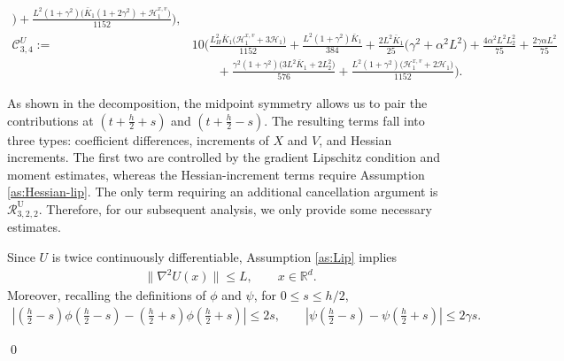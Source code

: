 \documentclass[12pt]{article}
\newenvironment{redtext}
  {\color{black}\ignorespaces}
  {\ignorespacesafterend}
\numberwithin{equation}{section}
\renewenvironment{proof}%
  {\begin{trivlist}%
   \item[]\ignorespaces}%
  {\qed\end{trivlist}}
\begin{document}
\begin{redtext}
\begin{proof}
\begin{align}
\big)
+
\tfrac{
L^2(1+\gamma^2)
\big(
\bar K_1(1+2\gamma^2)
+
\mathscr H_1^{x,v}
\big)
}{1152}
\Bigg),
\nonumber\\
%
\mathcal C^{U}_{3,4}
:=&
10\Bigg(
\tfrac{L_H^2\bar K_1
\big(
\mathscr H_1^{x,v}
+
3\mathscr H_1
\big)}{1152}
+
\tfrac{L^2(1+\gamma^2)\bar K_1}{384}
+
\tfrac{2L^2\bar K_1}{25}
\big(
\gamma^2+\alpha^2L^2
\big)
+
\tfrac{4\alpha^2L^2L_2^2}{75}
+
\tfrac{2\gamma\alpha L^2}{75}
\nonumber\\
&\qquad
+
\tfrac{
\gamma^2(1+\gamma^2)
\big(
3L^2\bar K_1
+
2L_2^2
\big)
}{576}
+
\tfrac{
L^2(1+\gamma^2)
\big(
\mathscr H_1^{x,v}
+
2\mathscr H_1
\big)
}{1152}
\Bigg).
\end{align}


\iffalse
As shown in the decomposition, the midpoint symmetry allows us to pair the contributions at $(t+\frac{h}{2}+s)$ and $(t+\frac{h}{2}-s)$. The resulting terms fall into three types: coefficient differences, increments of $X$ and $V$, and Hessian increments. The first two are controlled by the gradient Lipschitz condition and moment estimates, whereas the Hessian-increment terms require Assumption \ref{as:Hessian-lip}. The only term requiring an additional cancellation argument is $\mathcal R^{\mathrm{U}}_{3,2,2}$.
Therefore, for our subsequent analysis, we only provide some necessary estimates.

Since \(U\) is twice continuously differentiable, Assumption
\ref{as:Lip} implies
\begin{align}
\|\nabla^2U(x)\|
\leq
L,
\qquad
x\in\mathbb R^d.
\label{eq:Hessian-bound-UBU}
\end{align}
Moreover, recalling the definitions of \(\phi\) and \(\psi\), for
\(0\leq s\leq h/2\),
\begin{align}
\left|
(\tfrac h2-s)\phi(\tfrac h2-s)
-
(\tfrac h2+s)\phi(\tfrac h2+s)
\right|
\leq
2s, \qquad
\left|
\psi(\tfrac h2-s)
-
\psi(\tfrac h2+s)
\right|
\leq
2\gamma s.
\label{eq:R3-coefficient-estimates}
\end{align}


\end{proof}
\end{redtext}
\end{document}
